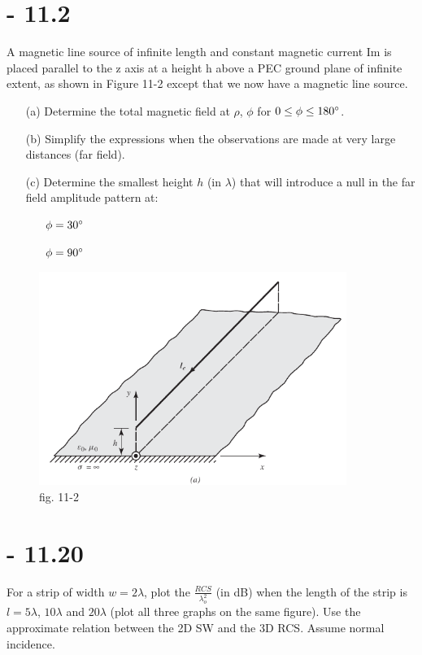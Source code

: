 \documentclass[12pt]{article}
\begin{document}
\section{- 11.2}
A magnetic line source of infinite length and constant magnetic current Im is placed parallel to the z axis at a height h above a PEC ground plane of infinite extent, as shown in Figure 11-2 except that we now have a magnetic line source.
\begin{itemize}
\item[(a)] Determine the total magnetic field at $\rho$, $\phi$ for $0\le \phi \le 180\degree$.
\item[(b)] Simplify the expressions when the observations are made at very large distances (far field).
\item[(c)] Determine the smallest height $h$ (in $\lambda$) that will introduce a null in the far field amplitude pattern at:
  \begin{itemize}
  \item[\cdot] $\phi = 30\degree$
  \item[\cdot] $\phi = 90\degree$
  \end{itemize}
\end{itemize}
\begin{center}
\begin{figure}[h]
    \centering
    \includegraphics[width=10cm]{./images/fig11-2.png}
    \caption{fig. 11-2}
    \label{fig:11-2}
  \end{figure}
\end{center}

\newpage
\section{- 11.20}
For a strip of width $w = 2\lambda$, plot the $\frac{RCS}{\lambda_o^2}$ (in dB) when the length of the strip is $l = 5\lambda$, $10\lambda$ and $20\lambda$ (plot all three graphs on the same figure). Use the approximate relation between the 2D SW and the 3D RCS. Assume normal incidence.

\newpage



\end{document}
